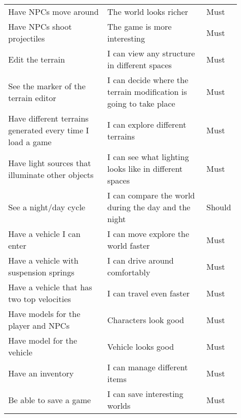 \begin{table}[H]
\begin{tabular}{p{0.4\linewidth}|p{0.4\linewidth}|p{0.1\linewidth}}
        Have NPCs move around                                      & The world looks richer                                             & Must           \\
        Have NPCs shoot projectiles                                & The game is more interesting                                       & Must           \\
        Edit the terrain                                           & I can view any structure in different spaces                       & Must           \\
        See the marker of the terrain editor                       & I can decide where the terrain modification is going to take place & Must           \\
        Have different terrains generated every time I load a game & I can explore different terrains                                   & Must           \\
        Have light sources that illuminate other objects           & I can see what lighting looks like in different spaces             & Must           \\
        See a night/day cycle                                      & I can compare the world during the day and the night               & Should         \\
        Have a vehicle I can enter                                 & I can move explore the world faster                                & Must           \\
        Have a vehicle with suspension springs                     & I can drive around comfortably                                     & Must           \\
        Have a vehicle that has two top velocities                 & I can travel even faster                                           & Must           \\
        Have models for the player and NPCs                        & Characters look good                                               & Must           \\
        Have model for the vehicle                                 & Vehicle looks good                                                 & Must           \\
        Have an inventory                                          & I can manage different items                                       & Must           \\
        Be able to save a game                                     & I can save interesting worlds                                      & Must           \\

\end{tabular}
\end{table}
